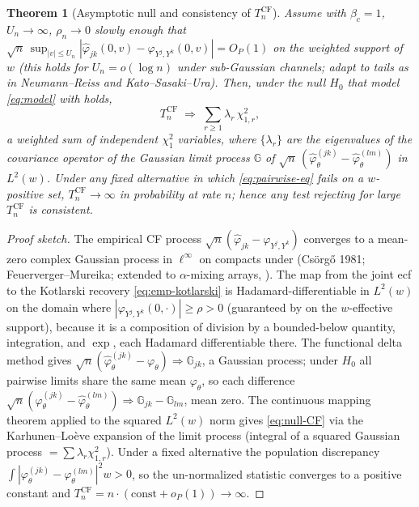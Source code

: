 \documentclass[11pt]{article}
\newtheorem{theorem}{Theorem}
\theoremstyle{definition}
\newcommand{\ecf}{\widehat{\varphi}}
\newcommand{\wto}{\Rightarrow}
\newcommand{\Th}{\theta}
\newcommand{\lat}{\Th}
\begin{document}
\begin{theorem}[Asymptotic null and consistency of $T_n^{\mathrm{CF}}$]
\label{thm:TnCF}
Assume  with $\beta_c=1$, $U_n\to\infty$,
$\rho_n\to0$ slowly enough that $\sqrt n\,\sup_{|v|\le U_n}
|\ecf_{jk}(0,v)-\varphi_{Y^j,Y^k}(0,v)|=O_P(1)$ on the weighted support of $w$
(this holds for $U_n=o(\log n)$ under sub-Gaussian channels; adapt to tails as
in Neumann--Reiss and Kato--Sasaki--Ura). Then, under the null $H_0$ that
model \eqref{eq:model} with  holds,
\begin{equation}\label{eq:null-CF}
  T_n^{\mathrm{CF}}\;\wto\; \sum_{r\ge1}\lambda_r\,\chi^2_{1,r},
\end{equation}
a weighted sum of independent $\chi^2_1$ variables, where $\{\lambda_r\}$ are
the eigenvalues of the covariance operator of the Gaussian limit process
$\mathbb G$ of $\sqrt n\,(\widehat\varphi_\lat^{(jk)}-\widehat\varphi_\lat^{(lm)})$
in $L^2(w)$. Under any fixed alternative in which \eqref{eq:pairwise-eq} fails
on a $w$-positive set, $T_n^{\mathrm{CF}}\to\infty$ in probability at rate $n$;
hence any test rejecting for large $T_n^{\mathrm{CF}}$ is consistent.
\end{theorem}

\begin{proof}[Proof sketch]
The empirical CF process $\sqrt n(\ecf_{jk}-\varphi_{Y^j,Y^k})$ converges to a
mean-zero complex Gaussian process in $\ell^\infty$ on compacts under
 (Cs\"org\H o 1981; Feuerverger--Mureika; extended to
$\alpha$-mixing arrays, ). The map from the joint ecf to the
Kotlarski recovery \eqref{eq:emp-kotlarski} is Hadamard-differentiable in
$L^2(w)$ on the domain where $|\varphi_{Y^j,Y^k}(0,\cdot)|\ge\rho>0$ (guaranteed
by  on the $w$-effective support), because it is a composition of
division by a bounded-below quantity, integration, and $\exp$, each Hadamard
differentiable there. The functional delta method gives
$\sqrt n(\widehat\varphi_\lat^{(jk)}-\varphi_\lat)\wto\mathbb G_{jk}$, a Gaussian
process; under $H_0$ all pairwise limits share the same mean $\varphi_\lat$, so
each difference $\sqrt n(\widehat\varphi_\lat^{(jk)}-\widehat\varphi_\lat^{(lm)})
\wto\mathbb G_{jk}-\mathbb G_{lm}$, mean zero. The continuous mapping theorem
applied to the squared $L^2(w)$ norm gives \eqref{eq:null-CF} via the
Karhunen--Lo\`eve expansion of the limit process (integral of a squared
Gaussian process $=\sum\lambda_r\chi^2_{1,r}$). Under a fixed alternative the
population discrepancy $\int|\varphi_\lat^{(jk)}-\varphi_\lat^{(lm)}|^2w>0$, so
the un-normalized statistic converges to a positive constant and $T_n^{\mathrm{CF}}
=n\cdot(\text{const}+o_P(1))\to\infty$.
\end{proof}
\end{document}
